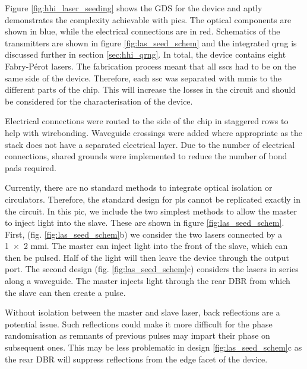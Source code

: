 Figure \ref{fig:hhi_laser_seeding} shows the GDS for the device and aptly demonstrates the complexity achievable with \acp{pic}. The optical components are shown in blue, while the electrical connections are in red. Schematics of the transmitters are shown in figure \ref{fig:las_seed_schem} and the integrated \ac{qrng} is discussed further in section \ref{sec:hhi_qrng}. In total, the device contains eight Fabry-P\'{e}rot lasers. The fabrication process meant that all \acp{ssc} had to be on the same side of the device. Therefore, each \ac{ssc} was separated with \acp{mmi} to the different parts of the chip. This will increase the losses in the circuit and should be considered for the characterisation of the device. 

Electrical connections were routed to the side of the chip in staggered rows to help with wirebonding. Waveguide crossings were added where appropriate as the stack does not have a separated electrical layer. Due to the number of electrical connections, shared grounds were implemented to reduce the number of bond pads required.


Currently, there are no standard methods to integrate optical isolation or circulators. Therefore, the standard design for \ac{pls} cannot be replicated exactly in the circuit. In this \ac{pic}, we include the two simplest methods to allow the master to inject light into the slave. These are shown in figure \ref{fig:las_seed_schem}. First, (fig. \ref{fig:las_seed_schem}b) we consider the two lasers connected by a \num{1x2} \ac{mmi}. The master can inject light into the front of the slave, which can then be pulsed. Half of the light will then leave the device through the output port. The second design (fig. \ref{fig:las_seed_schem}c) considers the lasers in series along a waveguide. The master injects light through the rear \ac{DBR} from which the slave can then create a pulse. 

Without isolation between the master and slave laser, back reflections are a potential issue. Such reflections could make it more difficult for the phase randomisation as remnants of previous pulses may impart their phase on subsequent ones. This may be less problematic in design \ref{fig:las_seed_schem}c as the rear \ac{DBR} will suppress reflections from the edge facet of the device. 


